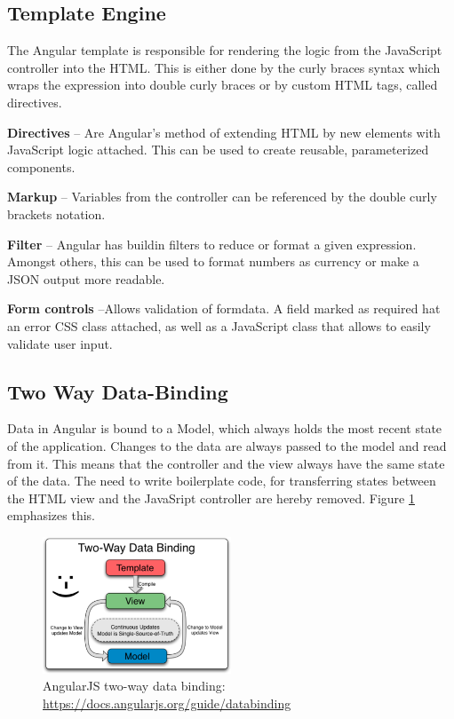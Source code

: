 \subsection{Template Engine}
The Angular template is responsible for rendering the logic from the JavaScript controller into the HTML. This is either done by the curly braces syntax which wraps the expression into double curly braces or by custom HTML tags, called directives.\vspace{1ex}

\noindent\textbf{Directives} -- Are Angular's method of extending HTML by new elements with JavaScript logic attached. This can be used to create reusable, parameterized components.\vspace{1ex}

\noindent\textbf{Markup} -- Variables from the controller can be referenced by the double curly brackets notation.\vspace{1ex}

\noindent\textbf{Filter} -- Angular has buildin filters to reduce or format a given expression. Amongst others, this can be used to format numbers as currency or make a JSON output more readable.\vspace{1ex}

\noindent\textbf{Form controls} --Allows validation of formdata. A field marked as required hat an error CSS class attached, as well as a JavaScript class that allows to easily validate user input.


\subsection{Two Way Data-Binding}
\label{sec:tw-binding}
Data in Angular is bound to a Model, which always holds the most recent state of the application. Changes to the data are always passed to the model and read from it. This means that the controller and the view always have the same state of the data. The need to write boilerplate code, for transferring states between the HTML view and the JavaSript controller are hereby removed. Figure \ref{fig:tw-databinding} emphasizes this.

\begin{figure}[H]
	\centering\includegraphics[width=0.5\textwidth]{res/Two_Way_Data_Binding}
	\caption{AngularJS two-way data binding: \url{https://docs.angularjs.org/guide/databinding}}
	\label{fig:tw-databinding}
\end{figure}


